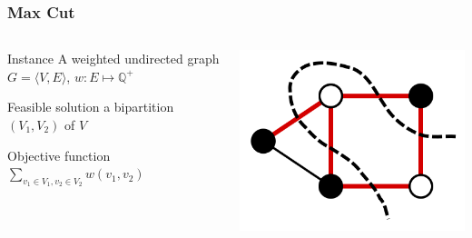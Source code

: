 \documentclass[12pt,aspectratio=169]{beamer}
\begin{document}
\begin{frame}\frametitle{Max Cut }
\begin{columns} 
  \begin{column}{0.48\textwidth}
  \begin{block}{Instance}
    A weighted undirected  graph $G=\langle V,E \rangle$, $w:E\mapsto \mathbb{Q}^{+}$
  \end{block}
  \begin{block}{Feasible solution}
    a bipartition $(V_{1},V_{2})$ of $V$
  \end{block}
  \begin{block}{Objective function}
    $\sum_{v_{1}\in V_{1}, v_{2}\in V_{2}} w(v_{1}, v_{2})$
  \end{block}
\end{column}
    
    \begin{column}{0.48\textwidth}
      \centering
  \includegraphics[height=0.7\textheight]{img/Max-cut}
\end{column}
\end{columns}
\end{frame}
\end{document}
